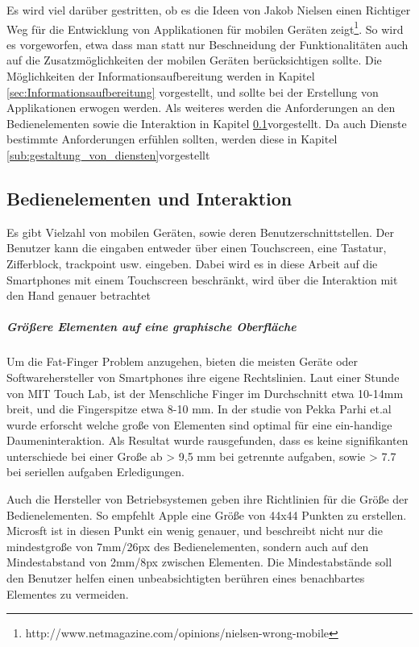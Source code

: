 Es wird viel darüber gestritten, ob es die Ideen von Jakob Nielsen einen Richtiger Weg für die Entwicklung von Applikationen für mobilen Geräten zeigt\footnote{http://www.netmagazine.com/opinions/nielsen-wrong-mobile}. So wird es vorgeworfen, etwa dass man statt nur Beschneidung der Funktionalitäten auch auf die Zusatzmöglichkeiten der mobilen Geräten berücksichtigen sollte. Die Möglichkeiten der Informationsaufbereitung werden in Kapitel \ref{sec:Informationsaufbereitung} vorgestellt, und sollte bei der Erstellung von Applikationen erwogen werden. Als weiteres werden die Anforderungen an den Bedienelementen sowie die Interaktion in Kapitel \ref{sub:Benutzerschnittstellen}vorgestellt. Da auch Dienste bestimmte Anforderungen erfühlen sollten, werden diese in Kapitel \ref{sub:gestaltung_von_diensten}vorgestellt 

\subsection{Bedienelementen und Interaktion}
\label{sub:Benutzerschnittstellen}

Es gibt Vielzahl von mobilen Geräten, sowie deren Benutzerschnittstellen. Der Benutzer kann die eingaben entweder über einen Touchscreen, eine Tastatur, Zifferblock, trackpoint usw. eingeben. Dabei wird es in diese Arbeit auf die Smartphones mit einem Touchscreen beschränkt, wird über die Interaktion mit den Hand genauer betrachtet

\subparagraph{Größere Elementen auf eine graphische Oberfläche } 
\label{subp:gro_ere_interface_elementen}

Um die Fat-Finger Problem anzugehen, bieten die meisten Geräte oder Softwarehersteller von Smartphones ihre eigene Rechtslinien. Laut einer Stunde von MIT Touch Lab, ist der Menschliche Finger im Durchschnitt etwa 10-14mm breit, und die Fingerspitze etwa 8-10 mm\cite{Srinivasan:2003uu}. In der studie von Pekka Parhi et.al\cite{Parhi:2006gh} wurde erforscht welche große von Elementen sind optimal für eine ein-handige Daumeninteraktion. Als Resultat wurde rausgefunden, dass es keine signifikanten unterschiede bei einer Große ab > 9,5 mm bei getrennte aufgaben, sowie > 7.7 bei seriellen aufgaben Erledigungen.  

Auch die Hersteller von Betriebsystemen geben ihre Richtlinien für die Größe der Bedienelementen. So empfehlt Apple eine Größe von 44x44 Punkten zu erstellen\cite{Apple}. Microsft ist in diesen Punkt ein wenig genauer, und beschreibt nicht nur die mindestgroße von 7mm/26px des Bedienelementen, sondern auch auf den Mindestabstand von 2mm/8px zwischen Elementen\cite{lukeGUI}. Die Mindestabstände soll den Benutzer helfen einen unbeabsichtigten berühren eines benachbartes Elementes zu vermeiden. 

